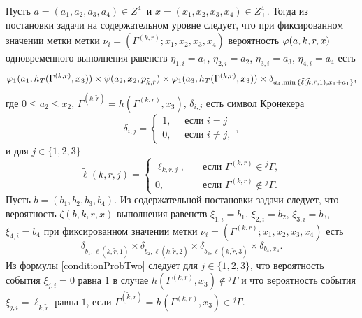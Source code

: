 \documentclass[a4paper,12pt,russian]{extarticle}
\newcommand{\G}{\Gamma}
\newcommand{\ga}[1]{\Gamma^{\left( #1 \right)} }
\begin{document}
Пусть $a=(a_1, a_2, a_3, a_4) \in Z_+^4$ и $x=(x_1, x_2, x_3, x_4) \in Z_+^4$. Тогда из постановки задачи на содержательном уровне следует, что при фиксированном значении метки метки $\nu_i=(\ga{k,r}; x_1, x_2, x_3, x_4)$ вероятность $\varphi(a,k,r,x)$ одновременного выполнения равенств $\eta_{1,i}=a_1$, $\eta_{2,i}=a_2$, $\eta_{3,i}=a_3$, $\eta_{4,i}=a_4$ есть 
\begin{equation}
\vp_1(a_1,h_T(\ga{{k},{r}},x_3)) \times \psi(a_2,x_2, p_{\tilde{k},\tilde{r}}) \times \vp_1(a_3,h_T(\ga{{k},{r}},x_3))
\times \delta_{a_4,\min{\{\tilde{\ell}(\tilde{k},\tilde{r},1), x_1+a_1}\}},
\label{conditionProbOne}
\end{equation}
где $0\leqslant a_2\leqslant x_2$, $\ga{\tilde{k},\tilde{r}}=h(\ga{k,r},x_3)$,  $\delta_{i,j}$ есть символ Кронекера
\begin{equation*}
\delta_{i,j}=\begin{cases} 1, \quad \text{ если }i=j\\0, \quad \text{ если } i\neq j,
\end{cases},
\end{equation*}
и для $j\in \{1, 2, 3\}$
\begin{equation*}
\widetilde{\ell}(k,r,j)=\begin{cases}
\ell_{k,r,j},& \quad \text{если } \ga{k,r} \in {}^j\G,\\
0,& \quad \text{если } \ga{k,r} \notin {}^j\G. \end{cases}
\end{equation*}
Пусть $b=(b_1, b_2, b_3, b_4)$. Из содержательной постановки задачи следует, что вероятность $\zeta(b, k, r, x)$ выполнения равенств $\xi_{1,i}=b_1$, $\xi_{2,i}=b_2$, $\xi_{3,i}=b_3$, $\xi_{4,i}=b_4$ при фиксированном значении метки $\nu_i=(\ga{k,r}; x_1, x_2, x_3, x_4)$ есть
\begin{equation}
\delta_{b_1,\tilde{\ell}(\tilde{k},\tilde{r},1)} \times \delta_{b_2,\tilde{\ell}(\tilde{k},\tilde{r},2)} \times 
\delta_{b_3,\tilde{\ell}(\tilde{k},\tilde{r},3)} \times \delta_{b_4,x_4}.
\label{conditionProbTwo}
\end{equation}
Из формулы \eqref{conditionProbTwo} следует для $j\in \{1, 2, 3\}$, что вероятность события $\xi_{j,i}=0$ равна $1$ в случае $h(\ga{k,r},x_3)\notin {}^j\G$ и что вероятность события $\xi_{j,i}=\ell_{\tilde{k},\tilde{r}}$ равна $1$, если $\ga{\tilde{k},\tilde{r}}=h(\ga{k,r},x_3)\in {}^j\G$.
\end{document}
